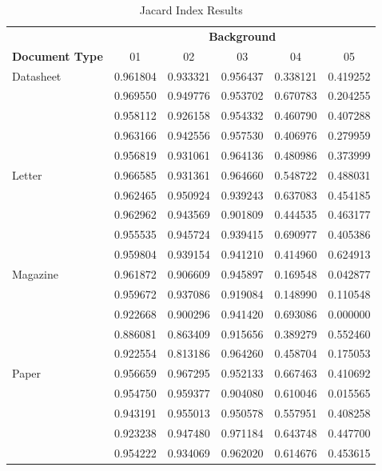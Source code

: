 \documentclass[english, paper=a4]{scrartcl}
\begin{document}
\begin{table}[]
\centering
\caption{Jacard Index Results}
\label{tax}
\begin{tabular}{l | p{2cm}| p{2cm}| p{2cm}| p{2cm}| p{2cm} }
\hline
& \multicolumn{5}{|c}{\textbf{Background}} \\
\textbf{Document Type} &  \multicolumn{1}{c}{01} & \multicolumn{1}{c}{02} & \multicolumn{1}{c}{03} & \multicolumn{1}{c}{04} &\multicolumn{1}{c}{05} \\ \hline\hline
Datasheet & 0.961804   & 0.933321  &0.956437 &0.338121 &0.419252  \\ 
           &0.969550 & 0.949776  &0.953702 &0.670783 &0.204255  \\ 
           & 0.958112  & 0.926158  &0.954332 &0.460790 &0.407288  \\ 
           & 0.963166  & 0.942556  &0.957530 &0.406976 &0.279959  \\ 
           & 0.956819  & 0.931061  &0.964136 &0.480986 &0.373999  \\ \hline
Letter & 0.966585 & 0.931361  &0.964660 &0.548722 &0.488031  \\    
		& 0.962465 & 0.950924  &0.939243 &0.637083 &0.454185  \\ 
		& 0.962962 & 0.943569  &0.901809 &0.444535 &0.463177  \\ 
		& 0.955535 & 0.945724  &0.939415 &0.690977 &0.405386  \\ 
		& 0.959804 & 0.939154  &0.941210 &0.414960 &0.624913  \\ \hline 
Magazine & 0.961872 & 0.906609  &0.945897 &0.169548 &0.042877  \\   
		& 0.959672 & 0.937086  &0.919084 &0.148990 &0.110548  \\ 
		& 0.922668 & 0.900296  &0.941420 &0.693086 &0.000000  \\ 
		& 0.886081 & 0.863409  &0.915656 &0.389279 &0.552460  \\ 
		& 0.922554 & 0.813186  &0.964260 &0.458704 &0.175053  \\ \hline 	
Paper & 0.956659 & 0.967295  &0.952133 &0.667463 &0.410692  \\   
		& 0.954750 & 0.959377  &0.904080 &0.610046 &0.015565  \\ 
		& 0.943191 & 0.955013  &0.950578 &0.557951 &0.408258  \\ 
		& 0.923238 & 0.947480  &0.971184 &0.643748 &0.447700  \\ 
		& 0.954222 & 0.934069  &0.962020 &0.614676 &0.453615  \\ \hline 	

\end{tabular}
\end{table}
\end{document}
